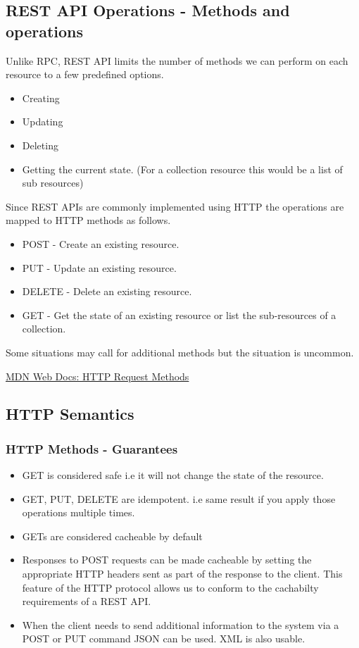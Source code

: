 \subsection{REST API Operations - Methods and operations}
Unlike RPC, REST API limits the number of methods we can perform on each resource to a few predefined options.
\begin{itemize}
    \item Creating
    \item Updating
    \item Deleting
    \item Getting the current state. (For a collection resource this would be a list of sub resources)
\end{itemize}

Since REST APIs are commonly implemented using HTTP the operations are mapped to HTTP methods as follows.
\begin{itemize}
    \item POST - Create an existing resource.
    \item PUT - Update an existing resource.
    \item DELETE - Delete an existing resource.
    \item GET - Get the state of an existing resource or list the sub-resources of a collection.
\end{itemize}

Some situations may call for additional methods but the situation is uncommon.

\href{https://developer.mozilla.org/en-US/docs/Web/HTTP/Reference/Methods?utm_source=chatgpt.com}{MDN Web Docs: HTTP Request Methods}

\subsection{HTTP Semantics}

\subsubsection{HTTP Methods - Guarantees}
\begin{itemize}
    \item GET is considered safe i.e it will not change the state of the resource.
    \item GET, PUT, DELETE are idempotent.
    i.e same result if you apply those operations multiple times.
    \item GETs are considered cacheable by default
    \item Responses to POST requests can be made cacheable by setting the appropriate HTTP headers sent as part of the response to the client.
    This feature of the HTTP protocol allows us to conform to the cachabilty requirements of a REST API.
    \item When the client needs to send additional information to the system via a POST or PUT command JSON can be used. XML is also usable.
\end{itemize}

